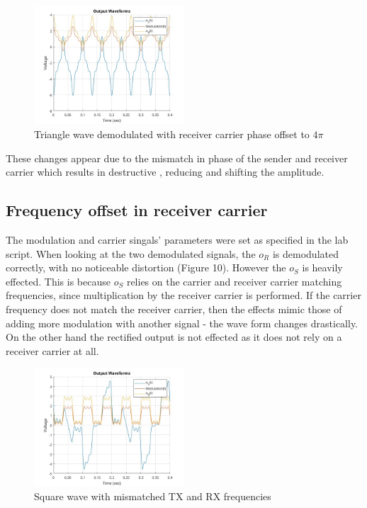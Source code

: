 \documentclass[a4paper]{article}
\begin{document}
        \begin{figure}[htbp]
        \centering

        \includegraphics[width=0.5\textwidth]{Images/AM_RX_1/Triangular Wave/Receiver Carrier Phase Offset/Output Waveforms + 4pi 4.jpg}
        \caption{Triangle wave demodulated with receiver carrier phase offset to $4\pi$ }

        \end{figure}

        These changes appear due to the mismatch in phase of the sender and receiver carrier which results in destructive , reducing and shifting the amplitude.


        \subsection*{Frequency offset in receiver carrier}
        The modulation and carrier singals' parameters were set as specified in the lab script. When looking at the two demodulated signals, the $o_R$ is demodulated correctly, with no noticeable distortion (Figure 10). However the $o_S$ is heavily effected. This is because $o_S$ relies on the carrier and receiver carrier matching frequencies, since multiplication by the receiver carrier is performed. If the carrier frequency does not match the receiver carrier, then the effects mimic those of adding more modulation with another signal - the wave form changes drastically. On the other hand the rectified output is not effected as it does not rely on a receiver carrier at all.

        \begin{figure}[htbp]
        \centering

        \includegraphics[width=0.5\textwidth]{Images/AM_RX_1/Square Wave/Receiver Carrier Frequency Offset/Output Waveforms.jpg}
        \caption{Square wave with mismatched TX and RX frequencies }

        \end{figure}
\end{document}
